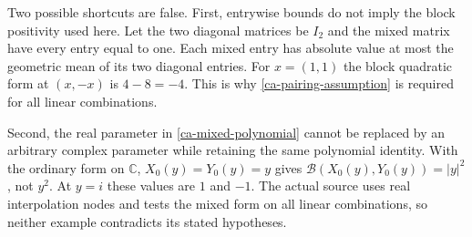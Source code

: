 \begin{remark}\label{ca-counterexamples}
Two possible shortcuts are false.  First, entrywise bounds
do not imply the block positivity used here.  Let the two
diagonal matrices be $I_2$ and the mixed matrix have every
entry equal to one.  Each mixed entry has absolute value
at most the geometric mean of its two diagonal entries.
For $x=(1,1)$ the block quadratic form at $(x,-x)$ is
$4-8=-4$.  This is why \eqref{ca-pairing-assumption} is
required for all linear combinations.

Second, the real parameter in
\eqref{ca-mixed-polynomial} cannot be replaced by an
arbitrary complex parameter while retaining the same
polynomial identity.  With the ordinary form on
$\mathbb C$, $X_0(y)=Y_0(y)=y$ gives
$\mathcal B(X_0(y),Y_0(y))=|y|^2$, not $y^2$.
At $y=i$ these values are $1$ and $-1$.
The actual source uses real interpolation nodes and
tests the mixed form on all linear combinations, so
neither example contradicts its stated hypotheses.
\end{remark}


